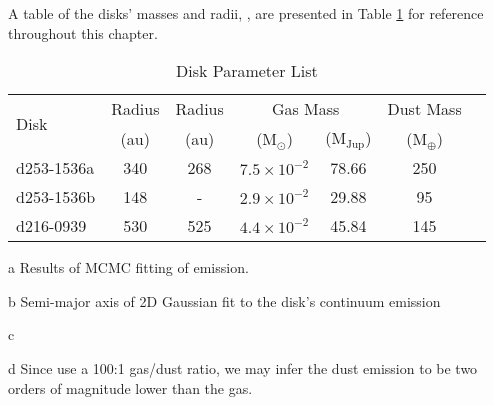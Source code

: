 A table of the disks' masses and radii, \citep[as well as those from][for comparison]{Factor2017}, are presented in Table \ref{table:disk_masses_rads} for reference throughout this chapter.


\begin{table}[ht!]
  \centering
  \begin{threeparttable}
    \caption{Disk Parameter List}
    \label{table:disk_masses_rads}
    \renewcommand{\arraystretch}{1.2}
    \begin{tabular}{l c c c c c c}
      \toprule \toprule
      \multirow{2}{*}{Disk}  & Radius\tnote{a} & Radius\tnote{b} & \multicolumn{2}{c}{Gas Mass\tnote{c}} &  Dust Mass\tnote{d} \\
                             & (au)            & (au)            & (M$_\odot$)       & (M$_\text{Jup}$)  & (M$_\oplus$)  \\
      \midrule %
      d253-1536a             & 340             & 268             & $7.5 \times 10^{-2}$        & 78.66   & 250   \\
      d253-1536b             & 148             &  -              & $2.9 \times 10^{-2}$        & 29.88   & 95    \\
      d216-0939              & 530             & 525             & $4.4 \times 10^{-2}$        & 45.84   & 145   \\
      \bottomrule
    \end{tabular}
    \begin{tablenotes}\footnotesize
      \item[a] Results of MCMC fitting of \hco{} emission.
      \item[b] Semi-major axis of 2D Gaussian fit to the disk's continuum emission \citep{Mann2014}
      \item[c] \citet{Williams2014}
      \item[d] Since \citet{Williams2014} use a 100:1 gas/dust ratio, we may infer the dust emission to be two orders of magnitude lower than the gas.
    \end{tablenotes}
  \end{threeparttable}
\end{table}









